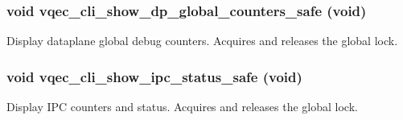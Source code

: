 \subsubsection{\setlength{\rightskip}{0pt plus 5cm}void vqec\_\-cli\_\-show\_\-dp\_\-global\_\-counters\_\-safe (void)}\label{vqec__cli__interface_8h_20623cdf496f43bdc2f7789160b6d963}


Display dataplane global debug counters. Acquires and releases the global lock. 
\subsubsection{\setlength{\rightskip}{0pt plus 5cm}void vqec\_\-cli\_\-show\_\-ipc\_\-status\_\-safe (void)}\label{vqec__cli__interface_8h_184dc0b61298ff79166787102f525dd8}


Display IPC counters and status. Acquires and releases the global lock. 